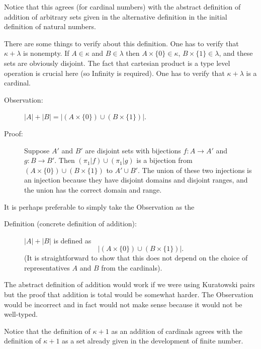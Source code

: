 \documentclass[12pt]{book}
\begin{document}
Notice that this agrees (for cardinal numbers) with the abstract definition of addition of arbitrary sets given in the alternative definition in the initial definition of natural numbers.

There are some things to verify about this definition.  One has to
verify that $\kappa+\lambda$ is nonempty.  If $A \in \kappa$ and $B
\in \lambda$ then $A \times \{0\} \in \kappa$, $B \times \{1\} \in
\lambda$, and these sets are obviously disjoint.  The fact that
cartesian product is a type level operation is crucial here (so
Infinity is required).  One has to verify that $\kappa+\lambda$ is a cardinal.

\begin{description}

\item[Observation:]  $|A| + |B| = |(A \times \{0\}) \cup (B \times \{1\})|$.

\item[Proof:] Suppose $A'$ and $B'$ are disjoint sets with bijections
$f:A \rightarrow A'$ and $g:B\rightarrow B'$.  Then $(\pi_1|f) \cup
(\pi_1|g)$ is a bijection from $(A \times \{0\}) \cup (B \times
\{1\})$ to $A' \cup B'$.  The union of these two injections is an
injection because they have disjoint domains and disjoint ranges, and
the union has the correct domain and range.

\end{description}

It is perhaps preferable to simply take the Observation as the

\begin{description}

\item[Definition (concrete definition of addition):] $|A| + |B|$ is defined as $$|(A
\times \{0\}) \cup (B \times \{1\})|.$$  (It is straightforward to show
that this does not depend on the choice of representatives $A$ and $B$
from the cardinals).

\end{description}

The abstract definition of addition would work if we were using
Kuratowski pairs but the proof that addition is total would be
somewhat harder.  The Observation would be incorrect and in fact would
not make sense because it would not be well-typed.

Notice that the definition of $\kappa+1$ as an addition of cardinals
agrees with the definition of $\kappa+1$ as a set already given in the
development of finite number.
\end{document}
